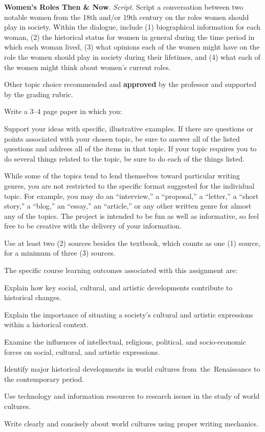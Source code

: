 \begin{enumerate*}
	\item \textbf{Women's Roles Then \& Now}. \emph{Script}. Script a conversation between two notable women from the 18th and/or 19th century on the roles women should play in society. Within the dialogue, include (1) biographical information for each woman, (2) the historical status for women in general during the time period in which each woman lived, (3) what opinions each of the women might have on the role the women should play in society during their lifetimes, and (4) what each of the women might think about women's current roles.

	\item Other topic choice recommended and \textbf{approved} by the professor and supported by the grading rubric.
\end{enumerate*}

Write a 3--4 page paper in which you:
\begin{itemize*}
	\item Support your ideas with specific, illustrative examples. If there are questions or points associated with your chosen topic, be sure to answer all of the listed questions and address all of the items in that topic. If your topic requires you to do several things related to the topic, be sure to do each of the things listed.
	\item While some of the topics tend to lend themselves toward particular writing genres, you are not restricted to the specific format suggested for the individual topic. For example, you may do an ``interview,'' a ``proposal,'' a ``letter,'' a ``short story,'' a ``blog,'' an ``essay,'' an ``article,'' or any other written genre for almost any of the topics. The project is intended to be fun as well as informative, so feel free to be creative with the delivery of your information.
	\item Use at least two (2) sources besides the textbook, which counts as one (1) source, for a minimum of three (3) sources.
\end{itemize*}

The specific course learning outcomes associated with this assignment are:
\begin{itemize*}
	\item Explain how key social, cultural, and artistic developments contribute to historical changes.
	\item Explain the importance of situating a society's cultural and artistic expressions within a historical context.
	\item Examine the influences of intellectual, religious, political, and socio-economic forces on social, cultural, and artistic expressions.
	\item Identify major historical developments in world cultures from the Renaissance to the contemporary period.
	\item Use technology and information resources to research issues in the study of world cultures.
	\item Write clearly and concisely about world cultures using proper writing mechanics.
\end{itemize*}

